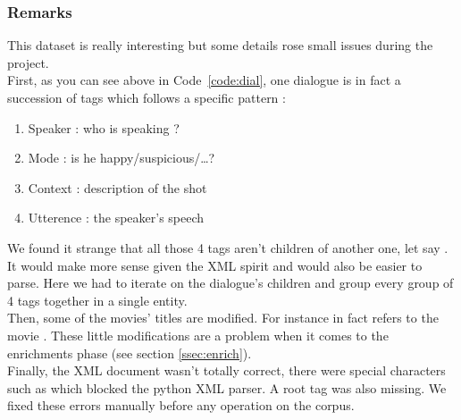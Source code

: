 \subsubsection{Remarks}
This dataset is really interesting but some details rose small issues during the project.\\
First, as you can see above in Code~\ref{code:dial}, one dialogue is in fact a succession of tags which follows a specific pattern :
\begin{enumerate}
\item Speaker : who is speaking ?
\item Mode : is he happy/suspicious/\dots ?
\item Context : description of the shot
\item Utterence : the speaker's speech
\end{enumerate}
We found it strange that all those 4 tags aren't children of another one, let say . It would make more sense given the XML spirit and would also be easier to parse. Here we had to iterate on the dialogue's children and group every group of 4 tags together in a single entity.\\
Then, some of the movies' titles are modified. For instance  in fact refers to the movie . These little modifications are a problem when it comes to the enrichments phase (see section \ref{ssec:enrich}). \\
Finally, the XML document wasn't totally correct, there were special characters such as \say{\&} which blocked the python XML parser. A root tag was also missing. We fixed these errors manually before any operation on the corpus.\\

